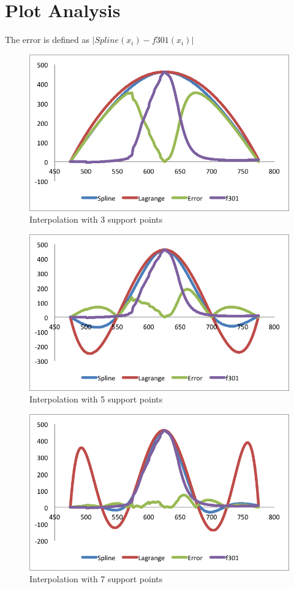\documentclass[12pt,a4paper]{article}
\begin{document}
\section{Plot Analysis}
The error is defined as $| Spline(x_i) - f301(x_i) |$
\begin{figure}[h!]
  \centering
      \includegraphics[width=1\textwidth]{./3.png}
  \caption{Interpolation with 3 support points}
\end{figure}
\newpage
\begin{figure}[h!]
  \centering
      \includegraphics[width=1\textwidth]{./5.png}
  \caption{Interpolation with 5 support points}
\end{figure}
\begin{figure}[h!]
  \centering
      \includegraphics[width=1\textwidth]{./7.png}
  \caption{Interpolation with 7 support points}
\end{figure}
\end{document}
